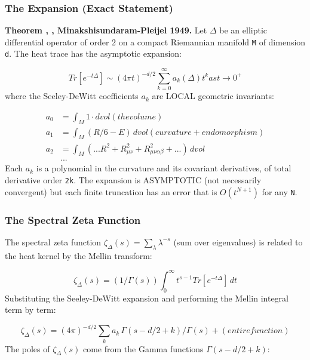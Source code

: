 \documentclass[aps,prd,preprint,superscriptaddress,longbibliography,floatfix]{revtex4-2}
\theoremstyle{remark}
\begin{document}
\subsubsection{The Expansion (Exact Statement)}

\textbf{Theorem \cite{Seeley1967}, \cite{DeWitt1965}, Minakshisundaram-Pleijel 1949.} Let $\Delta$ be an elliptic differential operator of order 2 on a compact Riemannian manifold \texttt{M} of dimension \texttt{d}. The heat trace has the asymptotic expansion:


\begin{equation}
    Tr[e^{-t\Delta}] \sim (4\pi t)^{-d/2} \sum_{k=0}^\infty a_k(\Delta) t^k    as t \to 0^{+}
\end{equation}
where the Seeley-DeWitt coefficients $a_k$ are LOCAL geometric invariants:


\begin{align}
    a_{0} &= \int_M 1 \cdot dvol  (the volume) \\
    a_{1} &= \int_M (R/6 - E)\, dvol  (curvature + endomorphism) \\
    a_{2} &= \int_M (...R^{2} + R_{\mu\nu}^{2} + R_{\mu\nu\alpha\beta}^{2} + ...)\, dvol \\
    & ...
\end{align}
Each $a_k$ is a polynomial in the curvature and its covariant derivatives, of total derivative order \texttt{2k}. The expansion is ASYMPTOTIC (not necessarily convergent) but each finite truncation has an error that is $O(t^{N+1})$ for any \texttt{N}.


\subsubsection{The Spectral Zeta Function}

The spectral zeta function $\zeta_\Delta(s) = \sum_\lambda \lambda^{-s}$ (sum over eigenvalues) is related to the heat kernel by the Mellin transform:


\begin{equation}
    \zeta_\Delta(s) = (1/\Gamma(s)) \int_0^\infty t^{s-1} Tr[e^{-t\Delta}]\, dt
\end{equation}
Substituting the Seeley-DeWitt expansion and performing the Mellin integral term by term:


\begin{equation}
    \zeta_\Delta(s) = (4\pi)^{-d/2} \sum_k a_k\, \Gamma(s - d/2 + k) / \Gamma(s) + (entire function)
\end{equation}
The poles of $\zeta_\Delta(s)$ come from the Gamma functions $\Gamma(s - d/2 + k)$:
\end{document}
